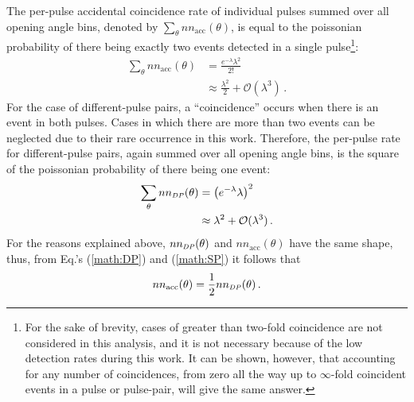 The per-pulse accidental coincidence rate of individual pulses summed over all opening angle bins, denoted by $\sum_{\theta} nn_{\text{acc}}(\theta)$, is equal to the poissonian probability of there being exactly two events detected in a single pulse\footnote{For the sake of brevity, cases of greater than two-fold coincidence are not considered in this analysis, and it is not necessary because of the low detection rates during this work.
It can be shown, however, that accounting for any number of coincidences, from zero all the way up to $\infty$-fold coincident events in a pulse or pulse-pair, will give the same answer.}:
\begin{equation} \label{math:SP}
    \begin{split}
    \sum_{\theta} nn_{\text{acc}}(\theta) & = \frac{e^{-\lambda}\lambda^{2}}{2!} \\
        &\approx \frac{\lambda^2}{{2}} + \mathcal{O}(\lambda^3) \, .
    \end{split}
\end{equation}
For the case of different-pulse pairs, a ``coincidence'' occurs when there is an event in both pulses.
Cases in which there are more than two events can be neglected due to their rare occurrence in this work.
Therefore, the per-pulse rate for different-pulse pairs, again summed over all opening angle bins, is the square of the poissonian probability of there being one event:
\begin{equation} \label{math:DP}
    \begin{split}
   \sum_{\theta} nn_{\scaleto{DP}{4pt}}(\theta)&= \left(e^{-\lambda}\lambda\right)^{2} \\
    &\approx \lambda^2 + \mathcal{O}(\lambda^3) \, .
    \end{split}
\end{equation}
For the reasons explained above, $nn_{\scaleto{DP}{4pt}}(\theta)$ and $nn_{\text{acc}}(\theta)$ have the same shape, thus, from Eq.'s (\ref{math:DP}) and (\ref{math:SP}) it follows that 
\begin{equation}
\label{eq:uncorr_DP}
nn_{\text{acc}}(\theta) = \frac{1}{2}nn_{\scaleto{DP}{4pt}}(\theta) \,.
\end{equation}

